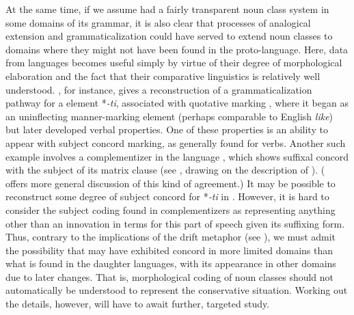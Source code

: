\documentclass[output=paper ,collection	  ,collectionchapter ,biblatexbackend=biber   ]{langscibook}
\begin{document}
At the same time, if we assume  had a fairly transparent
noun class system in some domains of its grammar, it is also clear that
processes of analogical extension and grammaticalization could have served to
extend noun classes to domains where they might not have been found in the
proto-language. Here, data from  languages becomes useful simply by virtue
of their degree of morphological elaboration and the fact that their comparative
linguistics is relatively well understood.
, for instance, gives a reconstruction of
a grammaticalization pathway for a  element \hbox{*\emph{-ti}},
associated with quotative marking \cite[105]{Guthrie19703}, where it began as
an uninflecting manner-marking element (perhaps comparable to English
\emph{like}) but later developed verbal properties. One of these properties is
an ability to appear with subject concord marking, as generally found for 
verbs. Another such example involves a complementizer in the  language
, which shows suffixal concord with the subject of its matrix clause (see
, drawing on the description of
). ( offers
more general discussion of this kind of agreement.) It may be possible to
reconstruct some degree of subject concord for *\emph{-ti} in .
However, it is hard to consider the subject coding found in 
complementizers as representing anything other than an innovation in  terms
for this part of speech given its suffixing form. Thus, contrary to the
implications of the drift metaphor (see ), we must admit the
possibility that  may have exhibited concord in more limited
domains than what is found in the daughter languages, with its appearance in
other domains due to later changes. That is, morphological coding of noun
classes should not automatically be understood to represent the conservative
situation. Working out the details, however, will have to await further,
targeted study.
\end{document}
